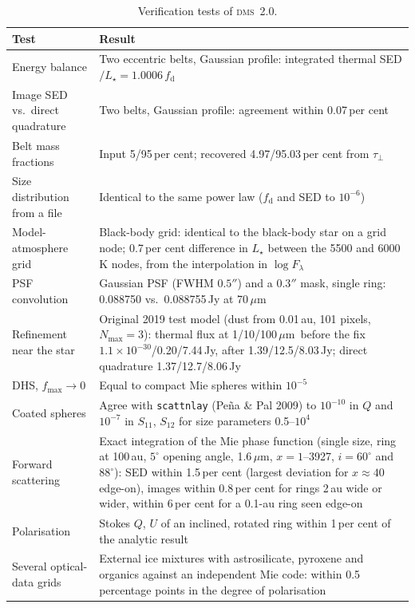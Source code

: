 \documentclass[11pt,a4paper]{article}
\newcommand{\dms}{\textsc{dms}}
\newcommand{\code}[1]{\texttt{#1}}
\newcommand{\um}{\,$\mu$m}
\begin{document}
\begin{table}[h]
\centering
\caption{Verification tests of \dms\ 2.0.}
\label{tab:verify}
\small
\begin{tabularx}{\textwidth}{@{}p{4.6cm}X@{}}
\toprule
Test & Result \\
\midrule
Energy balance & Two eccentric belts, Gaussian profile: integrated thermal SED$/L_\star =
  1.0006\,f_\mathrm{d}$ \\
Image SED vs.\ direct quadrature & Two belts, Gaussian profile: agreement within 0.07\,per cent \\
Belt mass fractions & Input 5/95\,per cent; recovered 4.97/95.03\,per cent from $\tau_\perp$ \\
Size distribution from a file & Identical to the same power law ($f_\mathrm{d}$ and SED to $10^{-6}$) \\
Model-atmosphere grid & Black-body grid: identical to the black-body star on a grid node;
  0.7\,per cent difference in $L_\star$ between the 5500 and 6000\,K nodes, from the interpolation
  in $\log F_\lambda$ \\
PSF convolution & Gaussian PSF (FWHM $0.5''$) and a $0.3''$ mask, single ring: 0.088750 vs.\
  0.088755\,Jy at 70\um\ \\
Refinement near the star & Original 2019 test model (dust from 0.01\,au, 101 pixels, $N_\mathrm{max}=3$):
  thermal flux at 1/10/100\um\ before the fix $1.1\times10^{-30}$/0.20/7.44\,Jy, after
  1.39/12.5/8.03\,Jy; direct quadrature 1.37/12.7/8.06\,Jy \\
DHS, $f_\mathrm{max}\to0$ & Equal to compact Mie spheres within $10^{-5}$ \\
Coated spheres & Agree with \code{scattnlay} (Pe\~na \& Pal 2009) to $10^{-10}$ in $Q$ and
  $10^{-7}$ in $S_{11}$, $S_{12}$ for size parameters 0.5--$10^4$ \\
Forward scattering & Exact integration of the Mie phase function (single size, ring at 100\,au,
  $5^\circ$ opening angle, 1.6\um, $x=1$--3927, $i=60^\circ$ and $88^\circ$): SED within 1.5\,per cent
  (largest deviation for $x\approx40$ edge-on), images within 0.8\,per cent for rings 2\,au wide or
  wider, within 6\,per cent for a 0.1-au ring seen edge-on \\
Polarisation & Stokes $Q$, $U$ of an inclined, rotated ring within 1\,per cent of the analytic result \\
Several optical-data grids & External ice mixtures with astrosilicate, pyroxene and organics against
  an independent Mie code: within 0.5 percentage points in the degree of polarisation \\

\end{tabularx}
\end{table}
\end{document}
